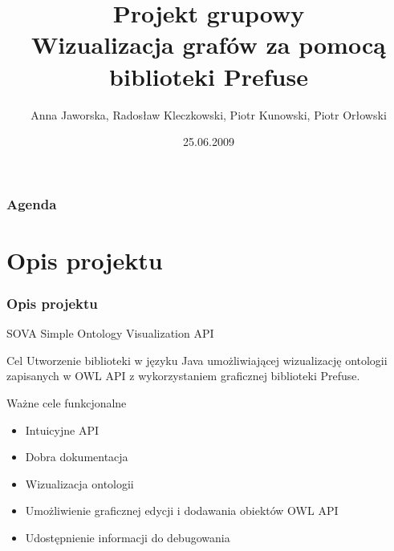 \documentclass[xcolor=dvipsnames,9pt]{beamer}
\author{Anna Jaworska, Radosław Kleczkowski, Piotr Kunowski, Piotr Orłowski}
\institute[Politechnika Gdańska]{opiekun: mgr inż. Tomasz Maria Boiński}
\title[SOVA]{Projekt grupowy \\ Wizualizacja grafów za pomocą biblioteki Prefuse}
\date{25.06.2009}
\begin{document}
\AtBeginSection[]
{
   \begin{frame}
       \frametitle{}
			\begin{center}
\begin{Huge}
\textcolor{brown}{\textbf{\insertsectionhead}}
\end{Huge}

\end{center}

   \end{frame}
}

\begin{frame}
	\titlepage
\end{frame}

\begin{frame}
	\frametitle{Agenda}
	\tableofcontents
\end{frame}

\section{Opis projektu}

\begin{frame}
	\frametitle{Opis projektu}
	 \begin{block}{SOVA}
		Simple Ontology Visualization API
	\end{block} 

	\begin{block}{Cel}
		Utworzenie biblioteki w języku Java umożliwiającej wizualizację ontologii zapisanych w OWL API z wykorzystaniem graficznej biblioteki Prefuse. 
	\end{block}
	\begin{block}{Ważne cele funkcjonalne}
		\begin{itemize}
			\item	Intuicyjne API
			\item Dobra dokumentacja
			\item Wizualizacja ontologii
			\item Umożliwienie graficznej edycji i dodawania obiektów OWL API
			\item Udostępnienie informacji do debugowania 
	        \end{itemize}
	\end{block}
\end{frame}
\end{document}
